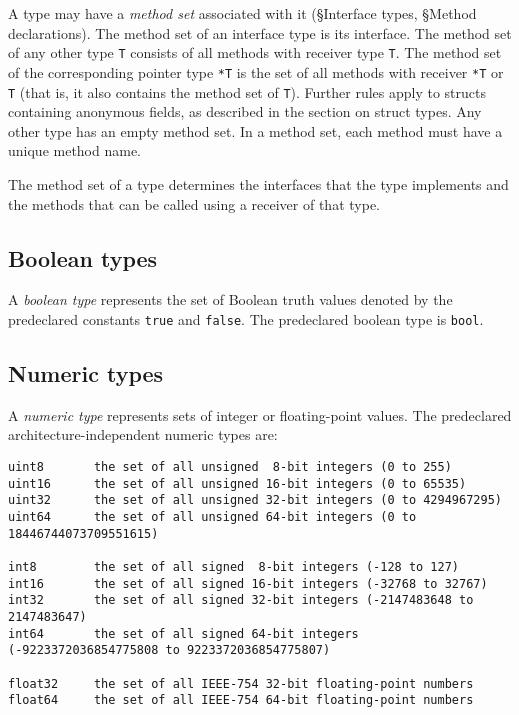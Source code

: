 {A type may have a \emph{method set} associated with it
(§Interface types,
§Method declarations). The method set
of an interface type is its interface. The
method set of any other type \texttt{T} consists of all methods with
receiver type \texttt{T}. The method set of the corresponding pointer
type \texttt{*T} is the set of all methods with receiver \texttt{*T} or
\texttt{T} (that is, it also contains the method set of \texttt{T}).
Further rules apply to structs containing anonymous fields, as described
in the section on struct types. Any other type
has an empty method set. In a method set, each method must have a
unique
method name.

The method set of a type determines the interfaces that the type
implements and the methods that can be
called using a receiver of that type.

\subsection*{Boolean types}

A \emph{boolean type} represents the set of Boolean truth values denoted
by the predeclared constants \texttt{true} and \texttt{false}. The
predeclared boolean type is \texttt{bool}.

\subsection*{Numeric types}

A \emph{numeric type} represents sets of integer or floating-point
values. The predeclared architecture-independent numeric types are:

\begin{Verbatim}[frame=single]
uint8       the set of all unsigned  8-bit integers (0 to 255)
uint16      the set of all unsigned 16-bit integers (0 to 65535)
uint32      the set of all unsigned 32-bit integers (0 to 4294967295)
uint64      the set of all unsigned 64-bit integers (0 to 18446744073709551615)

int8        the set of all signed  8-bit integers (-128 to 127)
int16       the set of all signed 16-bit integers (-32768 to 32767)
int32       the set of all signed 32-bit integers (-2147483648 to 2147483647)
int64       the set of all signed 64-bit integers (-9223372036854775808 to 9223372036854775807)

float32     the set of all IEEE-754 32-bit floating-point numbers
float64     the set of all IEEE-754 64-bit floating-point numbers


\end{Verbatim}}
